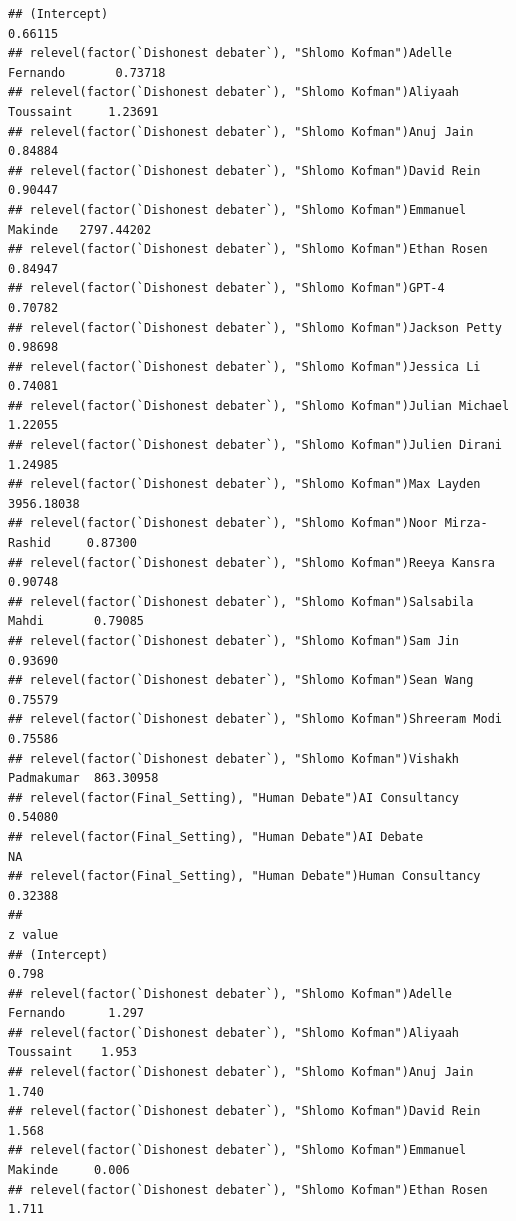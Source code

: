 \documentclass[
]{article}
\begin{document}
\begin{verbatim}
## (Intercept)                                                                0.66115
## relevel(factor(`Dishonest debater`), "Shlomo Kofman")Adelle Fernando       0.73718
## relevel(factor(`Dishonest debater`), "Shlomo Kofman")Aliyaah Toussaint     1.23691
## relevel(factor(`Dishonest debater`), "Shlomo Kofman")Anuj Jain             0.84884
## relevel(factor(`Dishonest debater`), "Shlomo Kofman")David Rein            0.90447
## relevel(factor(`Dishonest debater`), "Shlomo Kofman")Emmanuel Makinde   2797.44202
## relevel(factor(`Dishonest debater`), "Shlomo Kofman")Ethan Rosen           0.84947
## relevel(factor(`Dishonest debater`), "Shlomo Kofman")GPT-4                 0.70782
## relevel(factor(`Dishonest debater`), "Shlomo Kofman")Jackson Petty         0.98698
## relevel(factor(`Dishonest debater`), "Shlomo Kofman")Jessica Li            0.74081
## relevel(factor(`Dishonest debater`), "Shlomo Kofman")Julian Michael        1.22055
## relevel(factor(`Dishonest debater`), "Shlomo Kofman")Julien Dirani         1.24985
## relevel(factor(`Dishonest debater`), "Shlomo Kofman")Max Layden         3956.18038
## relevel(factor(`Dishonest debater`), "Shlomo Kofman")Noor Mirza-Rashid     0.87300
## relevel(factor(`Dishonest debater`), "Shlomo Kofman")Reeya Kansra          0.90748
## relevel(factor(`Dishonest debater`), "Shlomo Kofman")Salsabila Mahdi       0.79085
## relevel(factor(`Dishonest debater`), "Shlomo Kofman")Sam Jin               0.93690
## relevel(factor(`Dishonest debater`), "Shlomo Kofman")Sean Wang             0.75579
## relevel(factor(`Dishonest debater`), "Shlomo Kofman")Shreeram Modi         0.75586
## relevel(factor(`Dishonest debater`), "Shlomo Kofman")Vishakh Padmakumar  863.30958
## relevel(factor(Final_Setting), "Human Debate")AI Consultancy               0.54080
## relevel(factor(Final_Setting), "Human Debate")AI Debate                         NA
## relevel(factor(Final_Setting), "Human Debate")Human Consultancy            0.32388
##                                                                         z value
## (Intercept)                                                               0.798
## relevel(factor(`Dishonest debater`), "Shlomo Kofman")Adelle Fernando      1.297
## relevel(factor(`Dishonest debater`), "Shlomo Kofman")Aliyaah Toussaint    1.953
## relevel(factor(`Dishonest debater`), "Shlomo Kofman")Anuj Jain            1.740
## relevel(factor(`Dishonest debater`), "Shlomo Kofman")David Rein           1.568
## relevel(factor(`Dishonest debater`), "Shlomo Kofman")Emmanuel Makinde     0.006
## relevel(factor(`Dishonest debater`), "Shlomo Kofman")Ethan Rosen          1.711

\end{verbatim}
\end{document}
